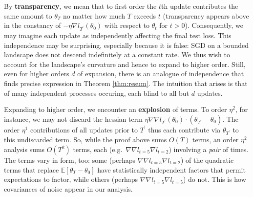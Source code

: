 \documentclass[anon,12pt]{colt2021} %
\newcommand{\pr}{\prime}
\newcommand{\expc}{\mathbb{E}}
\begin{document}
            By \textbf{transparency}, we mean that to first order the $t$th
            update contributes the same amount to $\theta_T$ no matter how much
            $T$ exceeds $t$ (transparency appears above in the constancy of
            \colorbox{moolime}{$- \eta \nabla l_{T^\pr}(\theta_0)$} with
            respect to $\theta_t$ for $t>0$). 
            Consequently, we may imagine each update as independently affecting
            the final test loss.  
            This independence may be surprising, especially because it is
            false: SGD on a bounded landscape does not descend indefinitely at
            a constant rate.  We thus wish to account for the landscape's
            curvature and hence to expand to higher order.
            Still, even for higher orders $d$ of expansion, there is an
            analogue of independence that finds precise expression in Theorem
            \ref{thm:resum}.  The intuition that arises is that of many
            independent processes occuring, each blind to all but $d$
            updates.

            Expanding to higher order, we encounter an \textbf{explosion} of
            terms.  To order $\eta^2$, for instance, we may not
            discard the hessian term \colorbox{moosky}{$\eta\nabla\nabla
            l_{T^\pr}(\theta_0) \cdot (\theta_{T^\pr} - \theta_0)$}.  The order
            $\eta^1$ contributions of all updates prior to $T^\pr$ thus each
            contribute via $\theta_{T^\pr}$ to this undiscarded term.  So,
            while the proof above sums $O(T)$ terms, an order $\eta^2$ analysis
            sums $O(T^2)$ terms, each (e.g.\ $\nabla\nabla l_{t=5} \nabla
            l_{t=2}$) involving a \emph{pair} of times.  The terms vary in
            form, too: some (perhaps $\nabla\nabla l_{t=5} \nabla l_{t=2}$) of
            the quadratic terms that replace \colorbox{moopink}{$\expc[\theta_T
            - \theta_0]$} have statistically independent factors that permit
            expectations to factor, while others (perhaps $\nabla\nabla l_{t=5}
            \nabla l_{t=5}$) do not.  This is how covariances of noise appear
            in our analysis.
\end{document}
